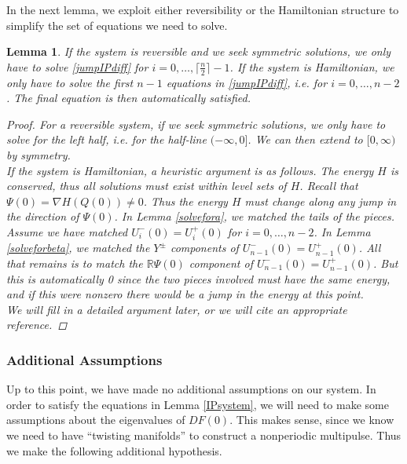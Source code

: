 \documentclass[12pt]{article}
\def\R{{\mathbb R}}
\newtheorem{lemma}{Lemma}
\begin{document}
In the next lemma, we exploit either reversibility or the Hamiltonian structure to simplify the set of equations we need to solve.

\begin{lemma}\label{IPsystemreduced}
If the system is reversible and we seek symmetric solutions, we only have to solve \eqref{jumpIPdiff} for $i = 0, \dots, \lceil \frac{n}{2} \rceil - 1$. If the system is Hamiltonian, we only have to solve the first $n-1$ equations in \eqref{jumpIPdiff}, i.e. for $i = 0, \dots, n-2$. The final equation is then automatically satisfied.

\begin{proof}
For a reversible system, if we seek symmetric solutions, we only have to solve for the left half, i.e. for the half-line $(-\infty, 0]$. We can then extend to $[0, \infty)$ by symmetry.\\

If the system is Hamiltonian, a heuristic argument is as follows. The energy $H$ is conserved, thus all solutions must exist within level sets of $H$. Recall that $\Psi(0) = \nabla H(Q(0)) \neq 0$. Thus the energy $H$ must change along any jump in the direction of $\Psi(0)$. In Lemma \ref{solvefora}, we matched the tails of the pieces. Assume we have matched $U_i^-(0) = U_i^+(0)$ for $i = 0, \dots, n-2$. In Lemma \ref{solveforbeta}, we matched the $Y^\pm$ components of $U_{n-1}^-(0) = U_{n-1}^+(0)$. All that remains is to match the $\R \Psi(0)$ component of $U_{n-1}^-(0) = U_{n-1}^+(0)$. But this is automatically 0 since the two pieces involved must have the same energy, and if this were nonzero there would be a jump in the energy at this point.\\

We will fill in a detailed argument later, or we will cite an appropriate reference.
\end{proof}
\end{lemma}

\subsubsection{Additional Assumptions}

Up to this point, we have made no additional assumptions on our system. In order to satisfy the equations in Lemma \ref{IPsystem}, we will need to make some assumptions about the eigenvalues of $DF(0)$. This makes sense, since we know we need to have ``twisting manifolds'' to construct a nonperiodic multipulse. Thus we make the following additional hypothesis.
\end{document}
